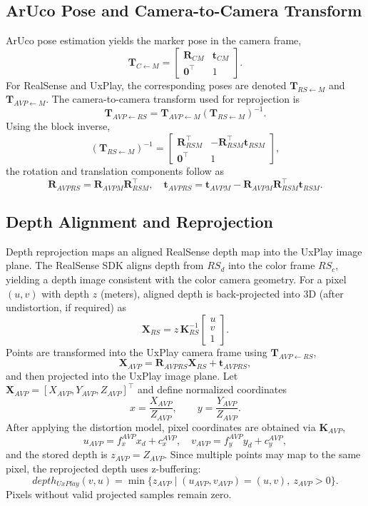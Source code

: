 \subsection{ArUco Pose and Camera-to-Camera Transform}
\label{app:aruco_transform_full}
ArUco pose estimation yields the marker pose in the camera frame,
\[
\mathbf{T}_{C \leftarrow M} =
\begin{bmatrix}
\mathbf{R}_{CM} & \mathbf{t}_{CM} \\
\mathbf{0}^\top & 1
\end{bmatrix}.
\]
For RealSense and UxPlay, the corresponding poses are denoted $\mathbf{T}_{RS \leftarrow M}$ and $\mathbf{T}_{AVP \leftarrow M}$. The camera-to-camera transform used for reprojection is
\[
\mathbf{T}_{AVP \leftarrow RS} =
\mathbf{T}_{AVP \leftarrow M}\left(\mathbf{T}_{RS \leftarrow M}\right)^{-1}.
\]
Using the block inverse,
\[
\left( \mathbf{T}_{RS \leftarrow M} \right)^{-1} =
\begin{bmatrix}
\mathbf{R}_{RSM}^\top & -\mathbf{R}_{RSM}^\top \mathbf{t}_{RSM} \\
\mathbf{0}^\top & 1
\end{bmatrix},
\]
the rotation and translation components follow as
\[
\mathbf{R}_{AVPRS} = \mathbf{R}_{AVPM} \mathbf{R}_{RSM}^\top,
\quad
\mathbf{t}_{AVPRS} = \mathbf{t}_{AVPM} - \mathbf{R}_{AVPM} \mathbf{R}_{RSM}^\top \mathbf{t}_{RSM}.
\]

\subsection{Depth Alignment and Reprojection}
\label{app:depth_reprojection_full}
Depth reprojection maps an aligned RealSense depth map into the UxPlay image plane. The RealSense SDK aligns depth from $RS_d$ into the color frame $RS_c$, yielding a depth image consistent with the color camera geometry. For a pixel $(u,v)$ with depth $z$ (meters), aligned depth is back-projected into 3D (after undistortion, if required) as
\[
\mathbf{X}_{RS} =
z \, \mathbf{K}_{RS}^{-1}
\begin{bmatrix}
u \\ v \\ 1
\end{bmatrix}.
\]
Points are transformed into the UxPlay camera frame using $\mathbf{T}_{AVP \leftarrow RS}$,
\[
\mathbf{X}_{AVP} =
\mathbf{R}_{AVPRS} \mathbf{X}_{RS} + \mathbf{t}_{AVPRS},
\]
and then projected into the UxPlay image plane. Let $\mathbf{X}_{AVP} = [X_{AVP},Y_{AVP},Z_{AVP}]^\top$ and define normalized coordinates
\[
x = \frac{X_{AVP}}{Z_{AVP}},\qquad y = \frac{Y_{AVP}}{Z_{AVP}}.
\]
After applying the distortion model, pixel coordinates are obtained via $\mathbf{K}_{AVP}$,
\[
u_{AVP} = f_x^{AVP} x_d + c_x^{AVP}, \quad
v_{AVP} = f_y^{AVP} y_d + c_y^{AVP},
\]
and the stored depth is $z_{AVP}=Z_{AVP}$. Since multiple points may map to the same pixel, the reprojected depth uses z-buffering:
\[
depth_{UxPlay}(v,u) = \min\{ z_{AVP} \mid (u_{AVP},v_{AVP})=(u,v),\ z_{AVP}>0 \}.
\]
Pixels without valid projected samples remain zero.


